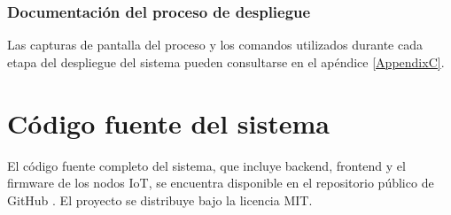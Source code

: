 \subsubsection{Documentación del proceso de despliegue}

Las capturas de pantalla del proceso y los comandos utilizados durante cada
etapa del despliegue del sistema pueden consultarse en el apéndice
\ref{AppendixC}.

\section{Código fuente del sistema}

El código fuente completo del sistema, que incluye backend, frontend y el
firmware de los nodos IoT, se encuentra disponible en el repositorio público de
GitHub \cite{EnviroSenseIoT}.
El proyecto se distribuye bajo la licencia MIT.